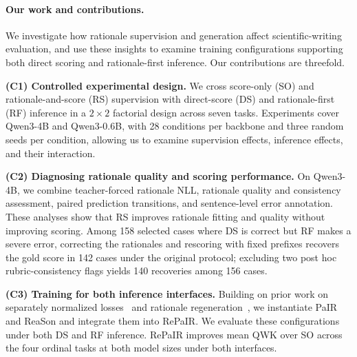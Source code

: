 \paragraph{Our work and contributions.}
We investigate how rationale supervision and generation affect
scientific-writing evaluation, and use these insights to examine
training configurations supporting both direct scoring and rationale-first inference.
Our contributions are threefold.

\textbf{(C1) Controlled experimental design.}
We cross score-only (SO) and rationale-and-score (RS) supervision
with direct-score (DS) and rationale-first (RF) inference
in a $2\times2$ factorial design across seven tasks.
Experiments cover Qwen3-4B and Qwen3-0.6B,
with 28 conditions per backbone and three random seeds per condition,
allowing us to examine supervision effects, inference effects,
and their interaction.

\textbf{(C2) Diagnosing rationale quality and scoring performance.}
On Qwen3-4B, we combine teacher-forced rationale NLL,
rationale quality and consistency assessment,
paired prediction transitions, and sentence-level error annotation.
These analyses show that RS improves rationale fitting and quality
without improving scoring.
Among 158 selected cases where DS is correct but RF makes a severe error,
correcting the rationales and rescoring with fixed prefixes recovers the
gold score in 142 cases under the original protocol; excluding two post hoc
rubric-consistency flags yields 140 recoveries among 156 cases.

\textbf{(C3) Training for both inference interfaces.}
Building on prior work on separately normalized
losses~\citep{shi-etal-2025-investigating} and rationale
regeneration~\citep{chiang-etal-2025-tract}, we instantiate PaIR and ReaSon and
integrate them into RePaIR. We evaluate these configurations under
both DS and RF inference. RePaIR improves mean QWK over SO across the four
ordinal tasks at both model sizes under both interfaces.